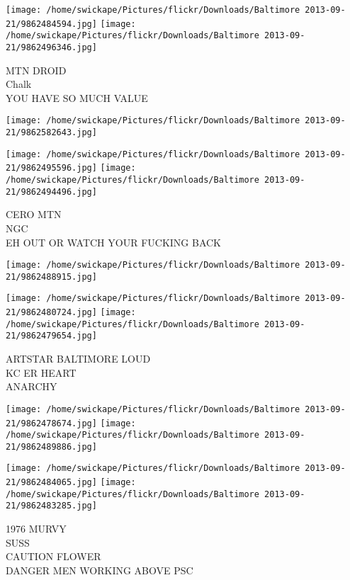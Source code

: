 \documentclass[10pt,letterpaper]{article}
\begin{document}
\vspace{0.25in}
\texttt{[image: /home/swickape/Pictures/flickr/Downloads/Baltimore 2013-09-21/9862484594.jpg]}
\texttt{[image: /home/swickape/Pictures/flickr/Downloads/Baltimore 2013-09-21/9862496346.jpg]}

MTN DROID\\
Chalk\\
YOU HAVE SO MUCH VALUE\\
\pagebreak

\texttt{[image: /home/swickape/Pictures/flickr/Downloads/Baltimore 2013-09-21/9862582643.jpg]}

\vspace{0.25in}
\texttt{[image: /home/swickape/Pictures/flickr/Downloads/Baltimore 2013-09-21/9862495596.jpg]}
\texttt{[image: /home/swickape/Pictures/flickr/Downloads/Baltimore 2013-09-21/9862494496.jpg]}

CERO MTN\\
NGC\\
EH OUT OR WATCH YOUR FUCKING BACK\\
\pagebreak

\texttt{[image: /home/swickape/Pictures/flickr/Downloads/Baltimore 2013-09-21/9862488915.jpg]}

\vspace{0.25in}
\texttt{[image: /home/swickape/Pictures/flickr/Downloads/Baltimore 2013-09-21/9862480724.jpg]}
\texttt{[image: /home/swickape/Pictures/flickr/Downloads/Baltimore 2013-09-21/9862479654.jpg]}

ARTSTAR BALTIMORE LOUD\\
KC ER HEART\\
ANARCHY\\
\pagebreak

\texttt{[image: /home/swickape/Pictures/flickr/Downloads/Baltimore 2013-09-21/9862478674.jpg]}
\texttt{[image: /home/swickape/Pictures/flickr/Downloads/Baltimore 2013-09-21/9862489886.jpg]}

\texttt{[image: /home/swickape/Pictures/flickr/Downloads/Baltimore 2013-09-21/9862484065.jpg]}
\texttt{[image: /home/swickape/Pictures/flickr/Downloads/Baltimore 2013-09-21/9862483285.jpg]}

1976 MURVY\\
SUSS\\
CAUTION FLOWER\\
DANGER MEN WORKING ABOVE PSC\\
\pagebreak
\end{document}

